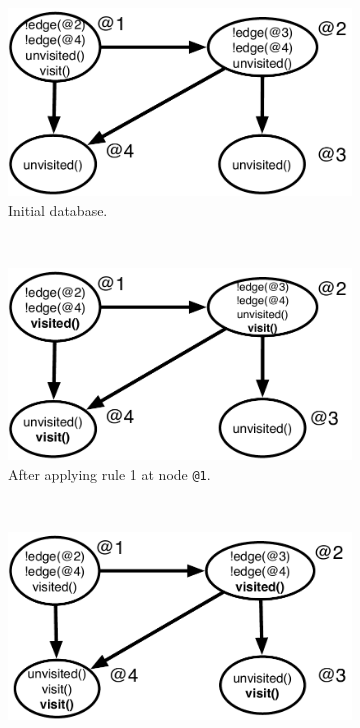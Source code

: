 \begin{figure}[h]
        \centering
        \begin{subfigure}[b]{0.5\textwidth}
                \includegraphics[width=\textwidth]{figures/visit/trace1}
                \caption{Initial database.}
                \label{fig:exec_trace1}
        \end{subfigure}%
        ~ %
        \begin{subfigure}[b]{0.5\textwidth}
                \includegraphics[width=\textwidth]{figures/visit/trace2}
                \caption{After applying rule 1 at node \texttt{@1}.}
                \label{fig:exec_trace2}
        \end{subfigure}\\
        \begin{subfigure}[b]{0.5\textwidth}
                \includegraphics[width=\textwidth]{figures/visit/trace3}

\end{subfigure}
\end{figure}
